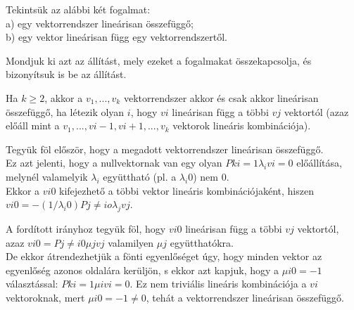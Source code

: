 \begin{frame}
  \begin{tcolorbox}[title={2. (4p)}]
     Tekintsük az alábbi két fogalmat:\\
     a) egy vektorrendszer lineárisan összefüggő;\\
     b) egy vektor lineárisan függ egy vektorrendszertől.\\
     \mmedskip
     
     Mondjuk ki azt az állítást, mely ezeket a fogalmakat összekapcsolja, és bizonyítsuk is be az állítást.
  \tcblower
  
    Ha $k \geq 2$, akkor a $v_1,...,v_k$ vektorrendszer akkor és csak akkor lineárisan összefüggő, ha létezik olyan $i$, hogy $vi$ lineárisan függ a többi $vj$ vektortól (azaz előáll mint a $v_1,...,vi-1,vi+1,...,v_k$ vektorok lineáris kombinációja).\\
    \mmedskip
    
    Tegyük föl először, hogy a megadott vektorrendszer lineárisan összefüggő.\\
    Ez azt jelenti, hogy a nullvektornak van egy olyan $Pk i=1 {\lambda}_ivi = 0$ előállítása, melynél valamelyik ${\lambda}_i$ együttható (pl. a ${\lambda}_i0$) nem $0$.\\
    
    Ekkor a $vi0$ kifejezhető a többi vektor lineáris kombinációjaként, hiszen $vi0 = -(1/{\lambda}_i0)Pj \neq io {\lambda}_jvj$.\\
    \mmedskip
    
    A fordított irányhoz tegyük föl, hogy $vi0$ lineárisan függ a többi $vj$ vektortól, azaz $vi0 = Pj \neq i0 {\mu}jvj$ valamilyen ${\mu}j$ együtthatókra.\\
    
    De ekkor átrendezhetjük a fönti egyenlőséget úgy, hogy minden vektor az egyenlőség azonos oldalára kerüljön, s ekkor azt kapjuk, hogy a ${\mu}i0 = -1$ választással: $Pk i=1 {\mu}ivi = 0$. Ez nem triviális lineáris kombinációja a $vi$ vektoroknak, mert ${\mu}i0 = -1 \neq 0$, tehát a vektorrendszer lineárisan összefüggő.
  \end{tcolorbox}
\end{frame}


